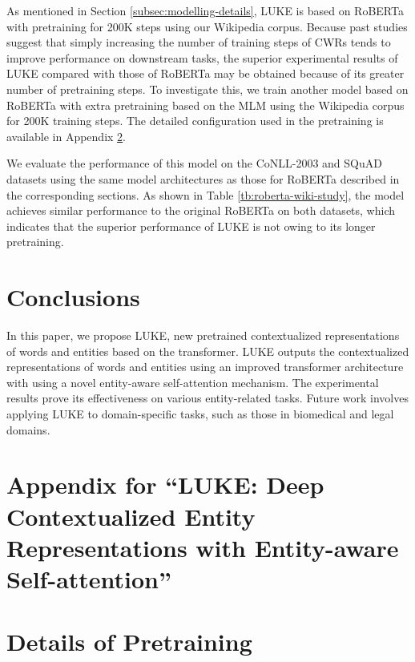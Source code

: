 \documentclass[11pt,a4paper]{article}
\begin{document}
\begin{table}[t]
As mentioned in Section \ref{subsec:modelling-details}, LUKE is based on RoBERTa with pretraining for 200K steps using our Wikipedia corpus.
Because past studies \cite{Liu2020RoBERTa:Approach,lan2019albert} suggest that simply increasing the number of training steps of CWRs tends to improve performance on downstream tasks, the superior experimental results of LUKE compared with those of RoBERTa may be obtained because of its greater number of pretraining steps.
To investigate this, we train another model based on RoBERTa with extra pretraining based on the MLM using the Wikipedia corpus for 200K training steps.
The detailed configuration used in the pretraining is available in Appendix \ref{sec:detail-pretraining}.

We evaluate the performance of this model on the CoNLL-2003 and SQuAD datasets using the same model architectures as those for RoBERTa described in the corresponding sections.
As shown in Table \ref{tb:roberta-wiki-study}, the model achieves similar performance to the original RoBERTa on both datasets, which indicates that the superior performance of LUKE is not owing to its longer pretraining.

\section{Conclusions}

In this paper, we propose LUKE, new pretrained contextualized representations of words and entities based on the transformer.
LUKE outputs the contextualized representations of words and entities using an improved transformer architecture with using a novel entity-aware self-attention mechanism.
The experimental results prove its effectiveness on various entity-related tasks.
Future work involves applying LUKE to domain-specific tasks, such as those in biomedical and legal domains.




\appendix

\section*{Appendix for ``LUKE: Deep Contextualized Entity Representations with Entity-aware Self-attention''}

\section{Details of Pretraining}
\label{sec:detail-pretraining}


\end{table}
\end{document}
